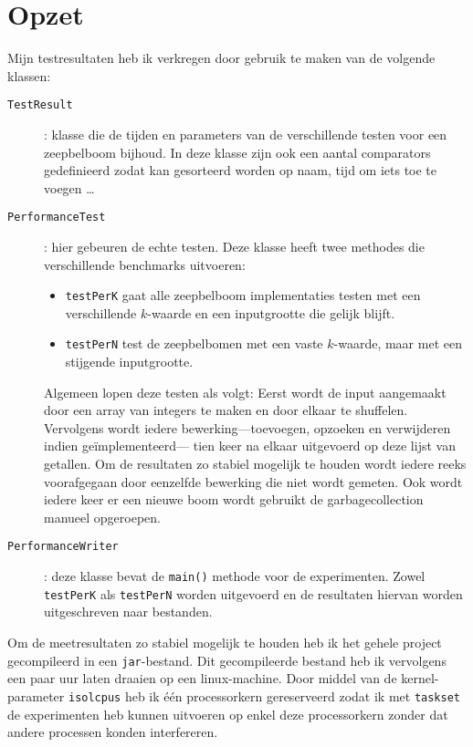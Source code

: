 \documentclass[12pt,hidelinks]{article}
\begin{document}
    \section{Opzet}
    Mijn testresultaten heb ik verkregen door gebruik te maken van de volgende klassen:
    \begin{description}
        \item[\tt TestResult]: klasse die de tijden en parameters van de verschillende testen voor een zeepbelboom bijhoud.
            In deze klasse zijn ook een aantal comparators gedefinieerd zodat kan gesorteerd worden op naam, tijd om iets toe te voegen \ldots
        \item [\tt PerformanceTest]: hier gebeuren de echte testen. 
            Deze klasse heeft twee methodes die verschillende benchmarks uitvoeren:
            \begin{itemize}
                \item {\tt testPerK} gaat alle zeepbelboom implementaties testen met een verschillende $k$-waarde en een inputgrootte die gelijk blijft.
                \item {\tt testPerN} test de zeepbelbomen met een vaste $k$-waarde, maar met een stijgende inputgrootte.
            \end{itemize}
            Algemeen lopen deze testen als volgt: Eerst wordt de input aangemaakt door een array van integers te maken en door elkaar te shuffelen.
            Vervolgens wordt iedere bewerking---toevoegen, opzoeken en verwijderen indien geïmplementeerd--- tien keer na elkaar uitgevoerd op deze lijst van getallen.
            Om de resultaten zo stabiel mogelijk te houden wordt iedere reeks voorafgegaan door eenzelfde bewerking die niet wordt gemeten.
            Ook wordt iedere keer er een nieuwe boom wordt gebruikt de garbagecollection manueel opgeroepen.
        \item[\tt PerformanceWriter]: deze klasse bevat de {\tt main()} methode voor de experimenten. Zowel {\tt testPerK} als {\tt testPerN} worden uitgevoerd en de resultaten hiervan worden uitgeschreven naar bestanden.
    \end{description}
    Om de meetresultaten zo stabiel mogelijk te houden heb ik het gehele project gecompileerd in een {\tt jar}-bestand.
    Dit gecompileerde bestand heb ik vervolgens een paar uur laten draaien op een linux-machine.
    Door middel van de kernel-parameter {\tt isolcpus} heb ik één processorkern gereserveerd zodat ik met {\tt taskset} de experimenten heb kunnen uitvoeren op enkel deze processorkern zonder dat andere processen konden interfereren.
\end{document}
